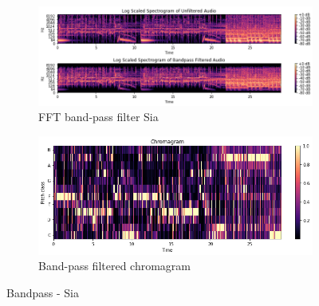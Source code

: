 \begin{figure}[htbp]
{{			\begin{subfigure}{.495\textwidth}
				\centering
				\includegraphics[scale=0.3]{Images/Chroma/siafft.png}
				\caption{FFT band-pass filter Sia}
				\label{siafft}
			\end{subfigure}%
			\begin{subfigure}{.495\textwidth}
				\centering
				\includegraphics[scale=0.3]{Images/Chroma/chroma_bp.png}
				\caption{Band-pass filtered chromagram}
				\label{pvfft}
			\end{subfigure}%
	}}
	\caption{Bandpass - Sia}
	\label{fig:sia2}
\end{figure}

